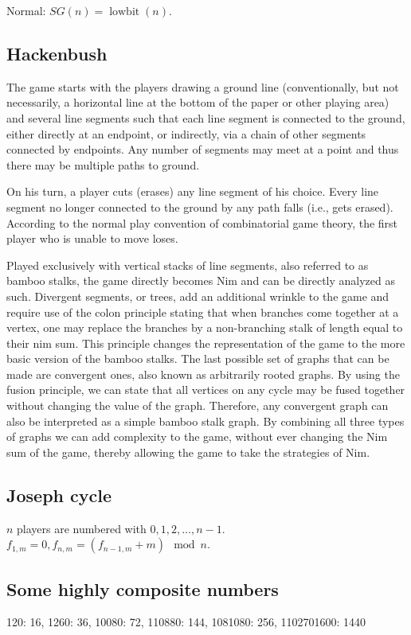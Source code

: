 Normal: $SG(n)=\operatorname{lowbit}(n)$.

\subsection{Hackenbush}
The game starts with the players drawing a ground line (conventionally, but not necessarily, a horizontal line at the bottom of the paper or other playing area) and several line segments such that each line segment is connected to the ground, either directly at an endpoint, or indirectly, via a chain of other segments connected by endpoints. Any number of segments may meet at a point and thus there may be multiple paths to ground.

On his turn, a player cuts (erases) any line segment of his choice. Every line segment no longer connected to the ground by any path falls (i.e., gets erased). According to the normal play convention of combinatorial game theory, the first player who is unable to move loses.

Played exclusively with vertical stacks of line segments, also referred to as bamboo stalks, the game directly becomes Nim and can be directly analyzed as such. Divergent segments, or trees, add an additional wrinkle to the game and require use of the colon principle stating that when branches come together at a vertex, one may replace the branches by a non-branching stalk of length equal to their nim sum. This principle changes the representation of the game to the more basic version of the bamboo stalks. The last possible set of graphs that can be made are convergent ones, also known as arbitrarily rooted graphs. By using the fusion principle, we can state that all vertices on any cycle may be fused together without changing the value of the graph. Therefore, any convergent graph can also be interpreted as a simple bamboo stalk graph. By combining all three types of graphs we can add complexity to the game, without ever changing the Nim sum of the game, thereby allowing the game to take the strategies of Nim.

\subsection{Joseph cycle}
$n$ players are numbered with $0,1,2,...,n-1$. $f_{1,m}=0,f_{n,m}=(f_{n-1,m}+m)\mod n$.

\subsection{Some highly composite numbers}
120: 16, 1260: 36, 10080: 72, 110880: 144, 1081080: 256, 1102701600: 1440

